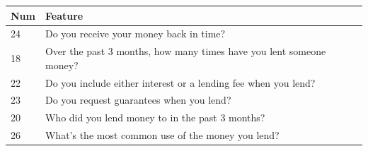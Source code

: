 \begin{longtable}[]{@{}ll@{}}
\toprule
\begin{minipage}[b]{0.05\columnwidth}\raggedright
Num\strut
\end{minipage} & \begin{minipage}[b]{0.89\columnwidth}\raggedright
Feature\strut
\end{minipage}\tabularnewline
\midrule
\endhead
\begin{minipage}[t]{0.05\columnwidth}\raggedright
24\strut
\end{minipage} & \begin{minipage}[t]{0.89\columnwidth}\raggedright
Do you receive your money back in time?\strut
\end{minipage}\tabularnewline
\begin{minipage}[t]{0.05\columnwidth}\raggedright
18\strut
\end{minipage} & \begin{minipage}[t]{0.89\columnwidth}\raggedright
Over the past 3 months, how many times have you lent someone
money?\strut
\end{minipage}\tabularnewline
\begin{minipage}[t]{0.05\columnwidth}\raggedright
22\strut
\end{minipage} & \begin{minipage}[t]{0.89\columnwidth}\raggedright
Do you include either interest or a lending fee when you lend?\strut
\end{minipage}\tabularnewline
\begin{minipage}[t]{0.05\columnwidth}\raggedright
23\strut
\end{minipage} & \begin{minipage}[t]{0.89\columnwidth}\raggedright
Do you request guarantees when you lend?\strut
\end{minipage}\tabularnewline
\begin{minipage}[t]{0.05\columnwidth}\raggedright
20\strut
\end{minipage} & \begin{minipage}[t]{0.89\columnwidth}\raggedright
Who did you lend money to in the past 3 months?\strut
\end{minipage}\tabularnewline
\begin{minipage}[t]{0.05\columnwidth}\raggedright
26\strut
\end{minipage} & \begin{minipage}[t]{0.89\columnwidth}\raggedright
What's the most common use of the money you lend?\strut

\end{minipage}
\end{longtable}
